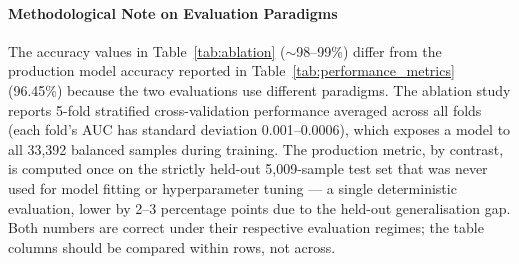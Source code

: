 \paragraph{Methodological Note on Evaluation Paradigms}

The accuracy values in Table~\ref{tab:ablation} ($\sim$98--99\%)
differ from the production model accuracy reported in
Table~\ref{tab:performance_metrics} (96.45\%) because the two
evaluations use different paradigms. The ablation study reports
5-fold stratified cross-validation performance averaged across all
folds (each fold's AUC has standard deviation 0.001--0.0006), which
exposes a model to all 33,392 balanced samples during training. The
production metric, by contrast, is computed once on the strictly
held-out 5,009-sample test set that was never used for model fitting or
hyperparameter tuning --- a single deterministic evaluation, lower by
2--3 percentage points due to the held-out generalisation gap. Both
numbers are correct under their respective evaluation regimes; the
table columns should be compared within rows, not across.

